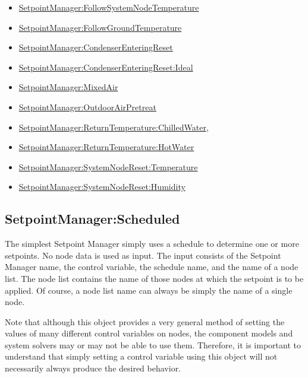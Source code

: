 \begin{itemize}
\item
  \hyperref[setpointmanagerfollowsystemnodetemperature]{SetpointManager:FollowSystemNodeTemperature}
\item
  \hyperref[setpointmanagerfollowgroundtemperature]{SetpointManager:FollowGroundTemperature}
\item
  \hyperref[setpointmanagercondenserenteringreset]{SetpointManager:CondenserEnteringReset}
\item
  \hyperref[setpointmanagercondenserenteringresetideal]{SetpointManager:CondenserEnteringReset:Ideal}
\item
  \hyperref[setpointmanagermixedair]{SetpointManager:MixedAir}
\item
  \hyperref[setpointmanageroutdoorairpretreat]{SetpointManager:OutdoorAirPretreat}
\item
  \hyperref[setpointmanagerreturntemperaturechilledwater]{SetpointManager:ReturnTemperature:ChilledWater},
\item
  \hyperref[setpointmanagerreturntemperaturehotwater]{SetpointManager:ReturnTemperature:HotWater}
\item
  \hyperref[setpointmanagersystemnoderesettemperature]{SetpointManager:SystemNodeReset:Temperature}
\item
  \hyperref[setpointmanagersystemnoderesethumidity]{SetpointManager:SystemNodeReset:Humidity}
\end{itemize}

\subsection{SetpointManager:Scheduled}\label{setpointmanagerscheduled}

The simplest Setpoint Manager simply uses a schedule to determine one or more setpoints. No node data is used as input. The input consists of the Setpoint Manager name, the control variable, the schedule name, and the name of a node list. The node list contains the name of those nodes at which the setpoint is to be applied. Of course, a node list name can always be simply the name of a single node.

Note that although this object provides a very general method of setting the values of many different control variables on nodes, the component models and system solvers may or may not be able to use them. Therefore, it is important to understand that simply setting a control variable using this object will not necessarily always produce the desired behavior.

